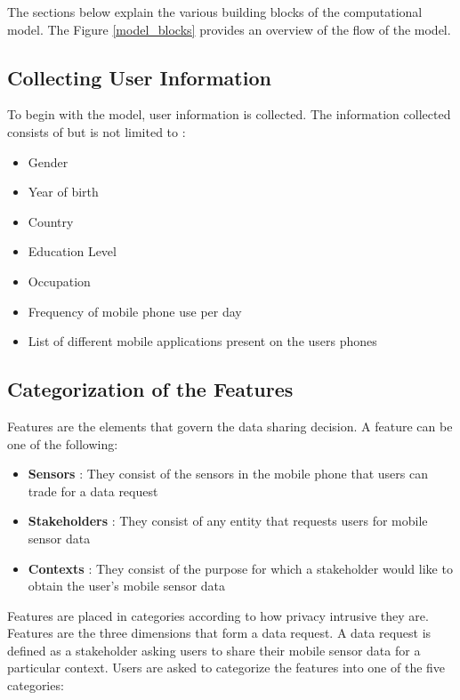 The sections below explain the various building blocks of the computational model. The Figure \ref{model_blocks}
provides an overview of the flow of the model.

\subsection{Collecting User Information}
To begin with the model, user information is collected. The information collected consists of but is not limited to :

\begin{itemize}
\item Gender
\item Year of birth
\item Country
\item Education Level
\item Occupation
\item Frequency of mobile phone use per day
\item List of different mobile applications present on the users phones
\end{itemize}

\subsection{Categorization of the Features} \label{catfeatures}

Features are the elements that govern the data sharing decision. A feature can be one of the following:
\begin{itemize}
\item \textbf{Sensors} : They consist of the sensors in the mobile phone that users can trade for a data request
\item \textbf{Stakeholders} : They consist of any entity that requests users for mobile sensor data
\item \textbf{Contexts} : They consist of the purpose for which a stakeholder would like to obtain the user's mobile sensor data
\end{itemize}

Features are placed in categories according to how privacy intrusive they are. Features are the three dimensions that form a data request. A data request is defined as a stakeholder asking users to share their mobile sensor data for a particular context. Users are asked to categorize the features into one of the five categories:

